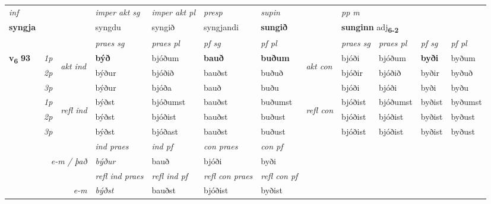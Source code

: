\begin{longtable}[l]{X>{\footnotesize\itshape}llXXXXlXXXX}
   {\textit{inf}} & &  & \textit{imper akt sg} & \textit{imper akt pl}   & \textit{presp} & \textit{supin}  && \textit{pp m} \\*
  {\textbf{syngja}} & && syngdu  & syngið   & syngjandi &  \textbf{sungið}  && \multicolumn{2}{l}{\textbf{sunginn} adj\textbf{\textsubscript{6-2}}} \\*

\midrule

 & &   & \textit{praes sg}  & \textit{praes pl}    & \textit{ pf sg} & \textit{pf pl} & & \textit{praes sg}  & \textit{praes pl}    & \textit{pf sg} & \textit{pf pl }  \\ \cmidrule{4-7} \cmidrule{9-12}
 \multirow{2}{*}{{{\textbf{v{\textsubscript{6}}} \Large{\textbf{93}}}}}  & 1p & \multirow{3}{*}{\begin{turn}{90}\textit{akt ind}\end{turn}} & \textbf{býð} & bjóðum & \textbf{bauð} & \textbf{buðum} & \multirow{3}{*}{\begin{turn}{90}\textit{akt con}\end{turn}} &bjóði & bjóðum & \textbf{byði} & byðum\\*
 & 2p &  &  býður  & bjóðið & bauðst & buðuð & & bjóðir & bjóðið & byðir & byðuð \\*
 & 3p &  & býður & bjóða & bauð & buðu & & bjóði & bjóði& byði & byðu \\*
\cmidrule{4-7} \cmidrule{9-12}
 & 1p & \multirow{3}{*}{\begin{turn}{90}\textit{refl ind}\end{turn}}  & býðst & bjóðumst & bauðst & buðumst & \multirow{3}{*}{\begin{turn}{90}\textit{refl con}\end{turn}}  &bjóðist & bjóðumst & byðist & byðumst \\*
 & 2p &  & býðst & bjóðist & bauðst & buðust & &bjóðist & bjóðist & byðist & byðust \\*
 & 3p  & & býðst & bjóðast & bauðst & buðust & & bjóðist & bjóðist& byðist & byðust \\*
\cmidrule{4-7} \cmidrule{9-12}

   && &  \textit{ind praes} & \textit{ind pf} & \textit{con praes} & \textit{con pf} \\*
\multicolumn{3}{r}{\textit{e-m / það}} & býður & bauð & bjóði & byði \\*

\cmidrule{4-7}
 & && \textit{refl ind praes} & \textit{refl ind pf} & \textit{refl con praes} & \textit{refl con pf} \\*
\multicolumn{3}{r}{\textit{e-m}}& býðst & bauðst & bjóðist & byðist \\*


\end{longtable}

